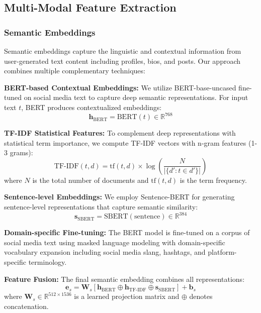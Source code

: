 \documentclass[conference]{IEEEtran}
\begin{document}
\subsection{Multi-Modal Feature Extraction}

\subsubsection{Semantic Embeddings}

Semantic embeddings capture the linguistic and contextual information from user-generated text content including profiles, bios, and posts. Our approach combines multiple complementary techniques:

\textbf{BERT-based Contextual Embeddings:} We utilize BERT-base-uncased \cite{devlin2018bert} fine-tuned on social media text to capture deep semantic representations. For input text $t$, BERT produces contextualized embeddings:
\begin{equation}
\mathbf{h}_{\text{BERT}} = \text{BERT}(t) \in \mathbb{R}^{768}
\end{equation}

\textbf{TF-IDF Statistical Features:} To complement deep representations with statistical term importance, we compute TF-IDF vectors with n-gram features (1-3 grams):
\begin{equation}
\text{TF-IDF}(t,d) = \text{tf}(t,d) \times \log\left(\frac{N}{|\{d' : t \in d'\}|}\right)
\end{equation}
where $N$ is the total number of documents and $\text{tf}(t,d)$ is the term frequency.

\textbf{Sentence-level Embeddings:} We employ Sentence-BERT for generating sentence-level representations that capture semantic similarity:
\begin{equation}
\mathbf{s}_{\text{SBERT}} = \text{SBERT}(\text{sentence}) \in \mathbb{R}^{384}
\end{equation}

\textbf{Domain-specific Fine-tuning:} The BERT model is fine-tuned on a corpus of social media text using masked language modeling with domain-specific vocabulary expansion including social media slang, hashtags, and platform-specific terminology.

\textbf{Feature Fusion:} The final semantic embedding combines all representations:
\begin{equation}
\mathbf{e}_s = \mathbf{W}_s[\mathbf{h}_{\text{BERT}} \oplus \mathbf{h}_{\text{TF-IDF}} \oplus \mathbf{s}_{\text{SBERT}}] + \mathbf{b}_s
\end{equation}
where $\mathbf{W}_s \in \mathbb{R}^{512 \times 1536}$ is a learned projection matrix and $\oplus$ denotes concatenation.
\end{document}
